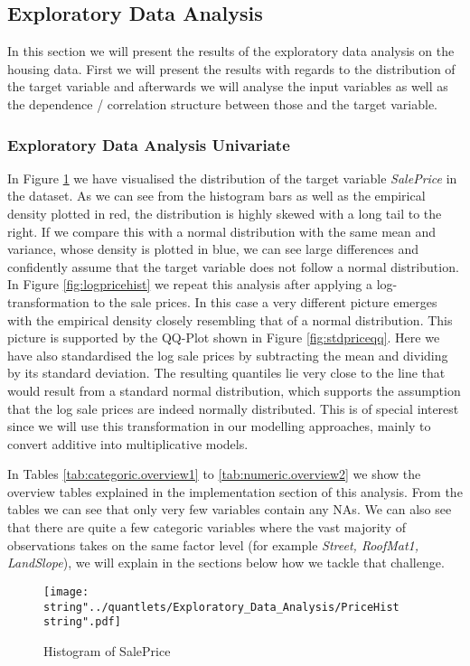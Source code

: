 \subsection{Exploratory Data Analysis}
In this section we will present the results of the exploratory data analysis on the housing data. First we will present the results with regards to the distribution of the target variable and afterwards we will analyse the input variables as well as the dependence / correlation structure between those and the target variable. 
\subsubsection{Exploratory Data Analysis Univariate}
In Figure \ref{fig:pricehist} we have visualised the distribution of the target variable \textit{SalePrice} in the dataset. As we can see from the histogram bars as well as the empirical density plotted in red, the distribution is highly skewed with a long tail to the right. If we compare this with a normal distribution with the same mean and variance, whose density is plotted in blue, we can see large differences and confidently assume that the target variable does not follow a normal distribution. 
In Figure \ref{fig:logpricehist} we repeat this analysis after applying a log-transformation to the sale prices. In this case a very different picture emerges with the empirical density closely resembling that of a normal distribution. This picture is supported by the QQ-Plot shown in Figure \ref{fig:stdpriceqq}. Here we have also standardised the log sale prices by subtracting the mean and dividing by its standard deviation. The resulting quantiles lie very close to the line that would result from a standard normal distribution, which supports the assumption that the log sale prices are indeed normally distributed. This is of special interest since we will use this transformation in our modelling approaches, mainly to convert additive into multiplicative models. 

In Tables \ref{tab:categoric.overview1} to \ref{tab:numeric.overview2} we show the overview tables explained in the implementation section of this analysis. From the tables we can see that only very few variables contain any NAs. We can also see that there are quite a few categoric variables where the vast majority of observations takes on the same factor level (for example \textit{Street, RoofMat1, LandSlope}), we will explain in the sections below how we tackle that challenge.

\begin{figure}[H]
  \centering
\texttt{[image: \\string"../quantlets/Exploratory\_Data\_Analysis/PriceHist\\string".pdf]}
  \caption{Histogram of SalePrice}\label{fig:pricehist}
\end{figure}

